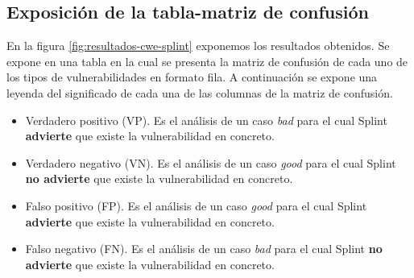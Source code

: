 \documentclass[12pt, a4paper, twoside]{article}
\begin{document}
\subsection{Exposición de la tabla-matriz de confusión}
En la figura \ref{fig:resultados-cwe-splint} exponemos los resultados obtenidos. Se expone en una tabla en la cual se presenta la matriz de confusión de cada uno de los tipos de vulnerabilidades en formato fila. A continuación se expone una leyenda del significado de cada una de las columnas de la matriz de confusión.
\begin{itemize}
	\item Verdadero positivo (VP). Es el análisis de un caso \textit{bad} para el cual Splint \textbf{advierte} que existe la vulnerabilidad en concreto.
	
	\item Verdadero negativo (VN). Es el análisis de un caso \textit{good} para el cual Splint \textbf{no advierte} que existe la vulnerabilidad en concreto.
	
	\item Falso positivo (FP). Es el análisis de un caso \textit{good} para el cual Splint \textbf{advierte} que existe la vulnerabilidad en concreto.
	
	\item Falso negativo (FN). Es el análisis de un caso \textit{bad} para el cual Splint \textbf{no advierte} que existe la vulnerabilidad en concreto.
\end{itemize}

\raggedbottom
\end{document}
